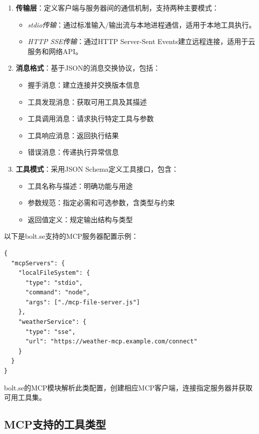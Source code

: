 \begin{enumerate}
  \item \textbf{传输层}：定义客户端与服务器间的通信机制，支持两种主要模式：
    \begin{itemize}
      \item \textit{stdio传输}：通过标准输入/输出流与本地进程通信，适用于本地工具执行。
      \item \textit{HTTP SSE传输}：通过HTTP Server-Sent Events建立远程连接，适用于云服务和网络API。
    \end{itemize}
  
  \item \textbf{消息格式}：基于JSON的消息交换协议，包括：
    \begin{itemize}
      \item 握手消息：建立连接并交换版本信息
      \item 工具发现消息：获取可用工具及其描述
      \item 工具调用消息：请求执行特定工具与参数
      \item 工具响应消息：返回执行结果
      \item 错误消息：传递执行异常信息
    \end{itemize}
  
  \item \textbf{工具模式}：采用JSON Schema定义工具接口，包含：
    \begin{itemize}
      \item 工具名称与描述：明确功能与用途
      \item 参数规范：指定必需和可选参数，含类型与约束
      \item 返回值定义：规定输出结构与类型
    \end{itemize}
\end{enumerate}

以下是bolt.se支持的MCP服务器配置示例：

\begin{verbatim}
{
  "mcpServers": {
    "localFileSystem": {
      "type": "stdio",
      "command": "node",
      "args": ["./mcp-file-server.js"]
    },
    "weatherService": {
      "type": "sse",
      "url": "https://weather-mcp.example.com/connect"
    }
  }
}
\end{verbatim}

bolt.se的MCP模块解析此类配置，创建相应MCP客户端，连接指定服务器并获取可用工具集。

\subsection{MCP支持的工具类型}

